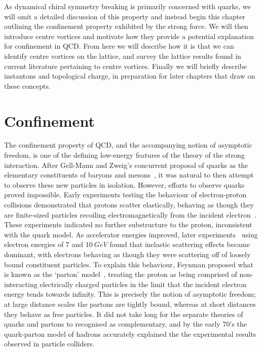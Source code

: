 As dynamical chiral symmetry breaking is primarily concerned with quarks, we will omit a detailed discussion of this property and instead begin this chapter outlining the confinement property exhibited by the strong force. We will then introduce centre vortices and motivate how they provide a potential explanation for confinement in QCD. From here we will describe how it is that we can identify centre vortices on the lattice, and survey the lattice results found in current literature pertaining to centre vortices. Finally we will briefly describe instantons and topological charge, in preparation for later chapters that draw on these concepts.  

\section{Confinement}\label{sec:Confinement}
The confinement property of QCD, and the accompanying notion of asymptotic freedom, is one of the defining low-energy features of the theory of the strong interaction. After Gell-Mann and Zweig's concurrent proposal of quarks as the elementary constituents of baryons and mesons~\cite{GellMann:1964nj,Zweig:1964jf}, it was natural to then attempt to observe these new particles in isolation. However, efforts to observe quarks proved impossible. Early experiments testing the behaviour of electron-proton collisions demonstrated that protons scatter elastically, behaving as though they are finite-sized particles recoiling electromagnetically from the incident electron~\cite{Hofstadter:1956qs}. These experiments indicated no further substructure to the proton, inconsistent with the quark model. As accelerator energies improved, later experiments~\cite{Bloom:1969kc, Breidenbach:1969kd} using electron energies of $7$ and $10~\si{GeV}$ found that inelastic scattering effects became dominant, with electrons behaving as though they were scattering off of loosely bound constituent particles. To explain this behaviour, Feynman proposed what is known as the `parton' model~\cite{Feynman:1969ej}, treating the proton as being comprised of non-interacting electrically charged particles in the limit that the incident electron energy tends towards infinity. This is precisely the notion of asymptotic freedom; at large distance scales the partons are tightly bound, whereas at short distances they behave as free particles. It did not take long for the separate theories of quarks and partons to recognised as complementary, and by the early 70's the quark-parton model of hadrons accurately explained the the experimental results observed in particle colliders.\\

